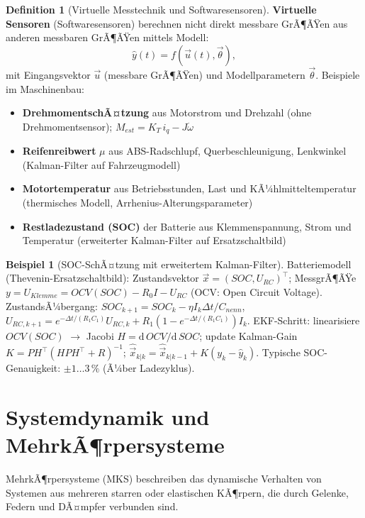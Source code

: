 ﻿\documentclass[a4paper,12pt]{report}
\theoremstyle{definition}
\newtheorem{definition}{Definition}
\newtheorem{beispiel}{Beispiel}
\begin{document}
\begin{definition}[Virtuelle Messtechnik und Softwaresensoren]
\textbf{Virtuelle Sensoren} (Softwaresensoren) berechnen nicht direkt messbare
GrÃ¶ÃŸen aus anderen messbaren GrÃ¶ÃŸen mittels Modell:
\[
  \hat{y}(t) = f(\vec{u}(t), \vec{\theta}),
\]
mit Eingangsvektor $\vec{u}$ (messbare GrÃ¶ÃŸen) und Modellparametern $\vec{\theta}$.
Beispiele im Maschinenbau:
\begin{itemize}
    \item[-] \textbf{DrehmomentschÃ¤tzung} aus Motorstrom und Drehzahl
          (ohne Drehmomentsensor); $M_{est} = K_T\,i_q - J\dot{\omega}$
    \item[-] \textbf{Reifenreibwert} $\mu$ aus ABS-Radschlupf, Querbeschleunigung,
          Lenkwinkel (Kalman-Filter auf Fahrzeugmodell)
    \item[-] \textbf{Motortemperatur} aus Betriebsstunden, Last und KÃ¼hlmitteltemperatur
          (thermisches Modell, Arrhenius-Alterungsparameter)
    \item[-] \textbf{Restladezustand (SOC)} der Batterie aus Klemmenspannung,
          Strom und Temperatur (erweiterter Kalman-Filter auf Ersatzschaltbild)
\end{itemize}
\end{definition}

\begin{beispiel}[SOC-SchÃ¤tzung mit erweitertem Kalman-Filter]
Batteriemodell (Thevenin-Ersatzschaltbild):
Zustandsvektor $\vec{x} = (SOC, U_{RC})^\top$;
MessgrÃ¶ÃŸe $y = U_{Klemme} = OCV(SOC) - R_0 I - U_{RC}$ (OCV: Open Circuit Voltage).
ZustandsÃ¼bergang: $SOC_{k+1} = SOC_k - \eta I_k \Delta t / C_{nenn}$,
$U_{RC,k+1} = e^{-\Delta t/(R_1 C_1)} U_{RC,k} + R_1(1-e^{-\Delta t/(R_1 C_1)})I_k$.
EKF-Schritt: linearisiere $OCV(SOC)$ $\to$ Jacobi $H = \mathrm{d}\,OCV/\mathrm{d}\,SOC$;
update Kalman-Gain $K = PH^\top(HPH^\top + R)^{-1}$;
$\hat{\vec{x}}_{k|k} = \hat{\vec{x}}_{k|k-1} + K(y_k - \hat{y}_k)$.
Typische SOC-Genauigkeit: $\pm 1\ldots3\,\%$ (Ã¼ber Ladezyklus).
\end{beispiel}

\chapter{Systemdynamik und MehrkÃ¶rpersysteme}

MehrkÃ¶rpersysteme (MKS) beschreiben das dynamische Verhalten von
Systemen aus mehreren starren oder elastischen KÃ¶rpern, die durch
Gelenke, Federn und DÃ¤mpfer verbunden sind.
\end{document}
